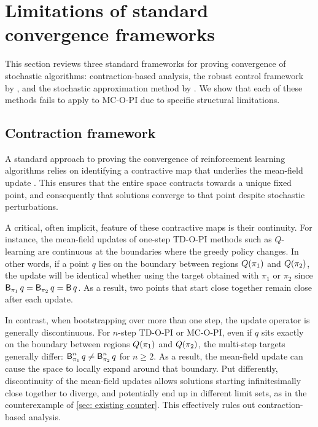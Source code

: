 \section{Limitations of standard convergence frameworks}
\label{sec: limitations of existing methods}

This section reviews three standard frameworks for proving convergence of stochastic algorithms: 
contraction-based analysis, 
the robust control framework by \cite{Kellett2004SmoothInclusions}, 
and the stochastic approximation method by \cite{Borkar2000TheLearning}. 
We show that each of these methods fails to apply to MC-O-PI due to specific structural limitations.

\subsection{Contraction framework}

A standard approach to proving the convergence of reinforcement learning algorithms relies on identifying a contractive map that underlies the mean-field update \citep{Bertsekas2018AbstractProgramming}.
This ensures that the entire space contracts towards a unique fixed point, and consequently that solutions converge to that point despite stochastic perturbations.

A critical, often implicit, feature of these contractive maps is their continuity. For instance, the mean-field updates of one-step TD-O-PI methods such as $Q$-learning are continuous at the boundaries where the greedy policy changes.
In other words, if a point $q$ lies on the boundary between regions $Q(\pi_1)$ and $Q(\pi_2)$, 
the update will be identical whether using the target obtained with $\pi_1$ or $\pi_2$ since $\operatorname{\mathsf{B}}_{\pi_1} q = \operatorname{\mathsf{B}}_{\pi_2} q = \operatorname{\mathsf{B}} q$. As a result, two points that start close together remain close after each update.

In contrast,
when bootstrapping over more than one step, the update operator is generally discontinuous.
For $n$-step TD-O-PI or MC-O-PI, even if $q$ sits exactly on the boundary between regions $Q(\pi_1)$ and $Q(\pi_2)$, the multi-step targets generally differ: $\operatorname{\mathsf{B}}_{\pi_1}^n q \neq \operatorname{\mathsf{B}}_{\pi_2}^n q$ for $n \ge 2$.
As a result, the mean-field update can cause the space to locally expand around that boundary.
Put differently, discontinuity of the mean-field updates allows solutions starting infinitesimally close together to diverge, and potentially end up in different limit sets, as in the counterexample of \autoref{sec: existing counter}.
This effectively rules out contraction-based analysis.

